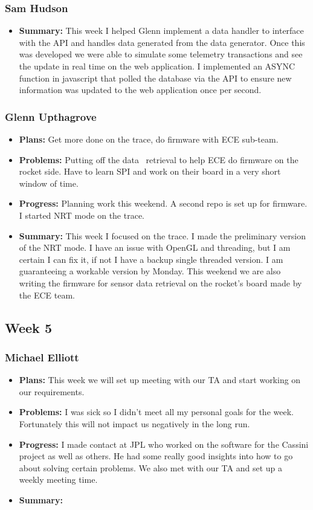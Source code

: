\documentclass[onecolumn, draftclsnofoot,10pt, compsoc]{IEEEtran}
\begin{document}
\subsubsection{Sam Hudson}
\begin {itemize}
\item \textbf{Summary: }This week I helped Glenn implement a data handler to interface with the API and handles data generated from the data generator. Once this was developed we were able to simulate some telemetry transactions and see the update in real time on the web application. I implemented an ASYNC function in javascript that polled the database via the API to ensure new information was updated to the web application once per second.
\end {itemize}
\subsubsection{Glenn Upthagrove}
\begin {itemize}
 \item \textbf{Plans: }Get more done on the trace, do firmware with ECE sub-team.
 \item \textbf{Problems: }Putting off the data  retrieval to help ECE do firmware on the rocket side. Have to learn SPI and work on their board in a very short window of time. 
 \item \textbf{Progress: }Planning work this weekend. A second repo is set up for firmware. I started NRT mode on the trace. 
 \item \textbf{Summary: }This week I focused on the trace. I made the preliminary version of the NRT mode. I have an issue with OpenGL and threading, but I am certain I can fix it, if not I have a backup single threaded version. I am guaranteeing a workable version by Monday. This weekend we are also writing the firmware for sensor data retrieval on the rocket's board made by the ECE team.  
\end {itemize}
\subsection {Week 5}
\subsubsection{Michael Elliott}
\begin {itemize}
\item \textbf{Plans: }
  This week we will set up meeting with our TA and start working on our requirements.
\item \textbf{Problems: }
  I was sick so I didn't meet all my personal goals for the week. Fortunately this will not impact us negatively in the long run.
\item \textbf{Progress: }
  I made contact at JPL who worked on the software for the Cassini project as well as others. He had some really good insights into how to go about solving certain problems. We also met with our TA and set up a weekly meeting time.
\item \textbf{Summary: }
\end {itemize}
\end{document}
